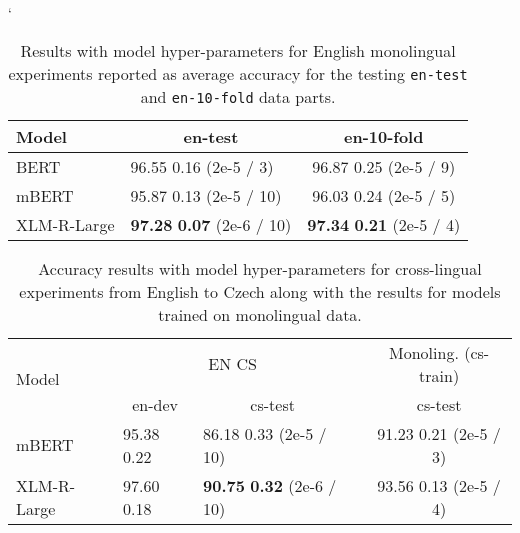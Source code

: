 \documentclass[10pt, a4paper]{article}
\begin{document}
\begin{table}[H]
\catcode`
\begin{adjustbox}{width=1\linewidth,center}
\begin{tabular}{llc} \toprule
Model                  & \multicolumn{1}{c}{en-test} & \multicolumn{1}{c}{en-10-fold} \\ \midrule
BERT             & 96.55  0.16 \footnotesize{(2e-5 / 3)}                & 96.87  0.25 \footnotesize{(2e-5 / 9)}             \\
mBERT            & 95.87  0.13 \footnotesize{(2e-5 / 10)}                & 96.03  0.24 \footnotesize{(2e-5 / 5)}             \\
XLM-R-Large            & \textbf{97.28}  \textbf{0.07} \footnotesize{(2e-6 / 10)}                 & \textbf{97.34}  \textbf{0.21} \footnotesize{(2e-5 / 4)}              \\ \bottomrule                     
\end{tabular}
\end{adjustbox}
\caption{Results with model hyper-parameters for English monolingual experiments reported as average accuracy for the testing \texttt{en-test} and \texttt{en-10-fold} data parts.} \label{tab:hyper-monolingual-en}
\end{table}

\begin{table}[H]
\begin{adjustbox}{width=1\linewidth,center}
\begin{tabular}{lllcc} \toprule
\multirow{2}{*}{Model}            & \multicolumn{2}{c}{EN  CS} & &  \multicolumn{1}{c}{ Monoling. (cs-train)}  \\ \cline{2-3} \cline{5-5} 
        & \multicolumn{1}{c}{en-dev}           & \multicolumn{1}{c}{cs-test} & & \multicolumn{1}{c}{cs-test}       \\ \midrule
mBERT & 95.38  0.22     & 86.18  0.33 \footnotesize{(2e-5 / 10)}   &   & 91.23  0.21 \footnotesize{(2e-5 / 3)} \\
XLM-R-Large & 97.60  0.18     & \textbf{90.75}  \textbf{0.32} \footnotesize{(2e-6 / 10)}  &  & 93.56  0.13 \footnotesize{(2e-5 / 4)} \\ \bottomrule
\end{tabular}
\end{adjustbox}
\caption{Accuracy results with model hyper-parameters for cross-lingual experiments from English to Czech along with the results for models trained on monolingual data.} \label{tab:hyper-crosslingual-en-cs}
\end{table}
\end{document}
